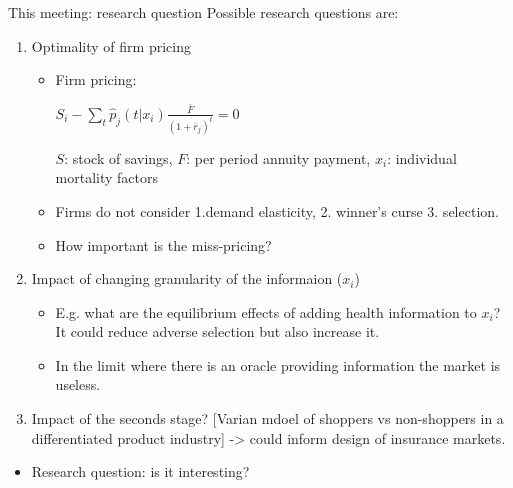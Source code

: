 \documentclass[10pt,aspectratio=169]{beamer}
\begin{document}
\begin{frame}{This meeting: research question}
Possible research questions are: 



 \begin{enumerate}
        \item Optimality of firm pricing 

        \begin{itemize}
            \item Firm pricing: 

            $S_{i}-\sum_{t}\hat{p}_{j}(t|x_{i}) \frac{\bar{F}}{(1+\bar{r}_{j})^{t}}=0$
            
            $S$: stock of savings, $F$: per period annuity payment, $x_i$: individual mortality factors 
            \item Firms do not consider 1.demand elasticity, 2. winner's curse 3. selection. 

            \item How important is the miss-pricing?
        \end{itemize}
        
        \item Impact of changing granularity of the informaion ($x_i$)

         \begin{itemize}
            \item E.g. what are the equilibrium effects of adding health information to $x_i$? It could reduce adverse selection but also increase it. 
            \item In the limit where there is an oracle providing information the market is useless. 
        \end{itemize}
        
        \item Impact of the seconds stage?  [Varian mdoel of shoppers vs non-shoppers in a differentiated product industry] -> could inform design of insurance markets.

    \end{enumerate}
    




\begin{itemize}
   
   
    \item Research question: is it interesting? 


     
\end{itemize}
\end{frame}
\end{document}
